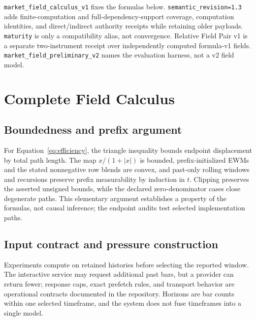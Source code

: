 \documentclass{article}
\begin{document}
\texttt{market\_field\_calculus\_v1} fixes the formulas below.
\texttt{semantic\_revision=1.3} adds finite-computation and
full-dependency-support coverage, computation identities, and direct/indirect
authority receipts while retaining older payloads. \texttt{maturity} is only a
compatibility alias, not convergence. Relative Field Pair v1 is a separate
two-instrument receipt over independently computed formula-v1 fields.
\texttt{market\_field\_preliminary\_v2} names the evaluation harness, not a v2
field model.

\section{Complete Field Calculus}
\label{app:calculus}

\subsection{Boundedness and prefix argument}
\label{app:prefix-proof}

For Equation~\ref{eq:efficiency}, the triangle inequality bounds endpoint displacement by total path length. The map $x/(1+|x|)$ is bounded, prefix-initialized EWMs and the stated nonnegative row blends are convex, and past-only rolling windows and recursions preserve prefix measurability by induction in $t$. Clipping preserves the asserted unsigned bounds, while the declared zero-denominator cases close degenerate paths. This elementary argument establishes a property of the formulas, not causal inference; the endpoint audits test selected implementation paths.

\subsection{Input contract and pressure construction}

Experiments compute on retained histories before selecting the reported window. The interactive service may request additional past bars, but a provider can return fewer; response caps, exact prefetch rules, and transport behavior are operational contracts documented in the repository. Horizons are bar counts within one selected timeframe, and the system does not fuse timeframes into a single model.
\end{document}
